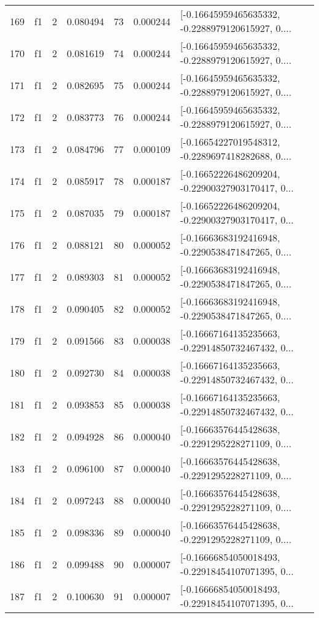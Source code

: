 \begin{tabular}{lllrlrl}
169 &  f1 &   2 &  0.080494 &   73 &  0.000244 &  [-0.16645959465635332, -0.2288979120615927, 0.... \\
170 &  f1 &   2 &  0.081619 &   74 &  0.000244 &  [-0.16645959465635332, -0.2288979120615927, 0.... \\
171 &  f1 &   2 &  0.082695 &   75 &  0.000244 &  [-0.16645959465635332, -0.2288979120615927, 0.... \\
172 &  f1 &   2 &  0.083773 &   76 &  0.000244 &  [-0.16645959465635332, -0.2288979120615927, 0.... \\
173 &  f1 &   2 &  0.084796 &   77 &  0.000109 &  [-0.16654227019548312, -0.2289697418282688, 0.... \\
174 &  f1 &   2 &  0.085917 &   78 &  0.000187 &  [-0.16652226486209204, -0.22900327903170417, 0... \\
175 &  f1 &   2 &  0.087035 &   79 &  0.000187 &  [-0.16652226486209204, -0.22900327903170417, 0... \\
176 &  f1 &   2 &  0.088121 &   80 &  0.000052 &  [-0.16663683192416948, -0.2290538471847265, 0.... \\
177 &  f1 &   2 &  0.089303 &   81 &  0.000052 &  [-0.16663683192416948, -0.2290538471847265, 0.... \\
178 &  f1 &   2 &  0.090405 &   82 &  0.000052 &  [-0.16663683192416948, -0.2290538471847265, 0.... \\
179 &  f1 &   2 &  0.091566 &   83 &  0.000038 &  [-0.16667164135235663, -0.22914850732467432, 0... \\
180 &  f1 &   2 &  0.092730 &   84 &  0.000038 &  [-0.16667164135235663, -0.22914850732467432, 0... \\
181 &  f1 &   2 &  0.093853 &   85 &  0.000038 &  [-0.16667164135235663, -0.22914850732467432, 0... \\
182 &  f1 &   2 &  0.094928 &   86 &  0.000040 &  [-0.16663576445428638, -0.2291295228271109, 0.... \\
183 &  f1 &   2 &  0.096100 &   87 &  0.000040 &  [-0.16663576445428638, -0.2291295228271109, 0.... \\
184 &  f1 &   2 &  0.097243 &   88 &  0.000040 &  [-0.16663576445428638, -0.2291295228271109, 0.... \\
185 &  f1 &   2 &  0.098336 &   89 &  0.000040 &  [-0.16663576445428638, -0.2291295228271109, 0.... \\
186 &  f1 &   2 &  0.099488 &   90 &  0.000007 &  [-0.16666854050018493, -0.22918454107071395, 0... \\
187 &  f1 &   2 &  0.100630 &   91 &  0.000007 &  [-0.16666854050018493, -0.22918454107071395, 0... \\

\end{tabular}

